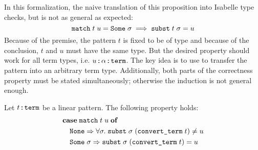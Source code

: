 \noindent
In this formalization, the naive translation of this proposition into Isabelle type checks, but is not as general as expected:
%
\[ \texttt{\textup{match}}\;t\;u = \texttt{\textup{Some}}\;\sigma \implies \texttt{\textup{subst}}\;t\;\sigma = u \]
%
Because of the premise, the pattern $t$ is fixed to be of type  and because of the conclusion, $t$ and $u$ must have the same type.
But the desired property should work for all term types, i.e. $u \mathbin{:\!\!:} \alpha \mathbin{:\!\!:} \texttt{\textup{term}}$.
The key idea is to use  to transfer the pattern into an arbitrary term type.
Additionally, both parts of the correctness property must be stated simultaneously; otherwise the induction is not general enough.

\begin{lemma}\label{thm:terms:algebra:match-subst}
  \setlength{\abovedisplayskip}{5pt}
  \setlength{\abovedisplayshortskip}{5pt}
  Let $t \mathbin{:\!\!:} \texttt{\textup{term}}$ be a linear pattern.
  The following property holds:
  \begin{align*}
    &\mathtt{\mathbf{case}}\;\texttt{\textup{match}}\;t\;u\;\mathtt{\mathbf{of}} \\
    &\quad\texttt{\textup{None}}\Rightarrow \forall \sigma.\; \texttt{\textup{subst}}\;\sigma\;(\texttt{\textup{convert\_term}}\;t) \neq u\\
    &\quad\texttt{\textup{Some}}\;\sigma\Rightarrow \texttt{\textup{subst}}\;\sigma\;(\texttt{\textup{convert\_term}}\;t) = u
  \end{align*}
\end{lemma}

